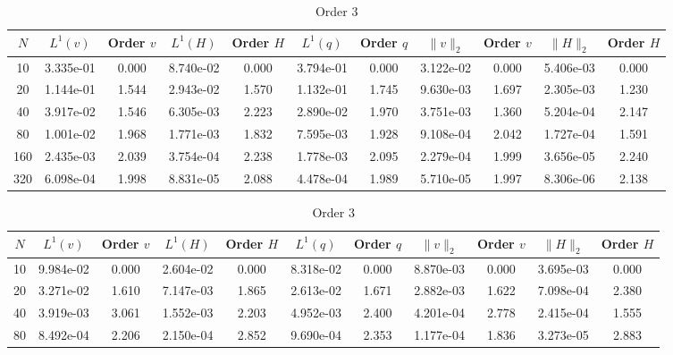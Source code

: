 \documentclass[english]{article}
\theoremstyle{thmstyleone}
\theoremstyle{thmstyletwo}
\theoremstyle{thmstylethree}
\begin{document}
\begin{table}[ht]
	\centering
	\caption{Transcritical Smooth}
	\label{tab:transcritical}
	\begin{adjustbox}{width=1\textwidth}
		\small
		\begin{subtable}{1.\linewidth}
			\centering
			\caption{Order 2}
			\begin{tabular}{ccccccccccc}
				\toprule
				$N$ & $L^1(v)$ & Order $v$ & $L^1(H)$ & Order $H$ & $L^1(q)$ & Order $q$ & $\|v\|_2$ & Order $v$ & $\|H\|_2$ & Order $H$ \\
				\midrule
				10 & 3.335e-01 & 0.000 & 8.740e-02 & 0.000 & 3.794e-01 & 0.000 & 3.122e-02 & 0.000 & 5.406e-03 & 0.000 \\
				20 & 1.144e-01 & 1.544 & 2.943e-02 & 1.570 & 1.132e-01 & 1.745 & 9.630e-03 & 1.697 & 2.305e-03 & 1.230 \\
				40 & 3.917e-02 & 1.546 & 6.305e-03 & 2.223 & 2.890e-02 & 1.970 & 3.751e-03 & 1.360 & 5.204e-04 & 2.147 \\
				80 & 1.001e-02 & 1.968 & 1.771e-03 & 1.832 & 7.595e-03 & 1.928 & 9.108e-04 & 2.042 & 1.727e-04 & 1.591 \\
				160 & 2.435e-03 & 2.039 & 3.754e-04 & 2.238 & 1.778e-03 & 2.095 & 2.279e-04 & 1.999 & 3.656e-05 & 2.240 \\
				320 & 6.098e-04 & 1.998 & 8.831e-05 & 2.088 & 4.478e-04 & 1.989 & 5.710e-05 & 1.997 & 8.306e-06 & 2.138 \\
				\bottomrule
			\end{tabular}
		\end{subtable}
	\end{adjustbox}
	\begin{adjustbox}{width=1\textwidth}
		\small
		\begin{subtable}{1.\linewidth}
			\centering
			\caption{Order 3}
			\begin{tabular}{ccccccccccc}
				\toprule
				$N$ & $L^1(v)$ & Order $v$ & $L^1(H)$ & Order $H$ & $L^1(q)$ & Order $q$ & $\|v\|_2$ & Order $v$ & $\|H\|_2$ & Order $H$ \\
				\midrule
				10 & 9.984e-02 & 0.000 & 2.604e-02 & 0.000 & 8.318e-02 & 0.000 & 8.870e-03 & 0.000 & 3.695e-03 & 0.000 \\
				20 & 3.271e-02 & 1.610 & 7.147e-03 & 1.865 & 2.613e-02 & 1.671 & 2.882e-03 & 1.622 & 7.098e-04 & 2.380 \\
				40 & 3.919e-03 & 3.061 & 1.552e-03 & 2.203 & 4.952e-03 & 2.400 & 4.201e-04 & 2.778 & 2.415e-04 & 1.555 \\
				80 & 8.492e-04 & 2.206 & 2.150e-04 & 2.852 & 9.690e-04 & 2.353 & 1.177e-04 & 1.836 & 3.273e-05 & 2.883 \\

\end{tabular}
\end{subtable}
\end{adjustbox}
\end{table}
\end{document}
